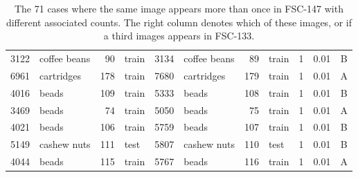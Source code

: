 \documentclass[letterpaper, 11pt]{IEEEtran}
\begin{document}
\begin{table*}[!ht]
{\begin{tabular}{clrlclrlrlc}
3122 & coffee beans & 90 & train & 3134 & coffee beans & 89 & train & 1 & 0.01 & B\\
6961 & cartridges & 178 & train & 7680 & cartridges & 179 & train & 1 & 0.01 & A\\
4016 & beads & 109 & train & 5333 & beads & 108 & train & 1 & 0.01 & B\\
3469 & beads & 74 & train & 5050 & beads & 75 & train & 1 & 0.01 & A\\
4021 & beads & 106 & train & 5759 & beads & 107 & train & 1 & 0.01 & B\\
5149 & cashew nuts & 111 & test & 5807 & cashew nuts & 110 & test & 1 & 0.01 & B\\
4044 & beads & 115 & train & 5767 & beads & 116 & train & 1 & 0.01 & A\\
\bottomrule
\end{tabular}
 }
     \caption{The 71 cases where the same image appears more than once in FSC-147 with different associated counts. The right column denotes which of these images, or if a third images appears in FSC-133.}
    \label{FSC_COUNT_DIFF}
    
\end{table*}
\clearpage
\end{document}

